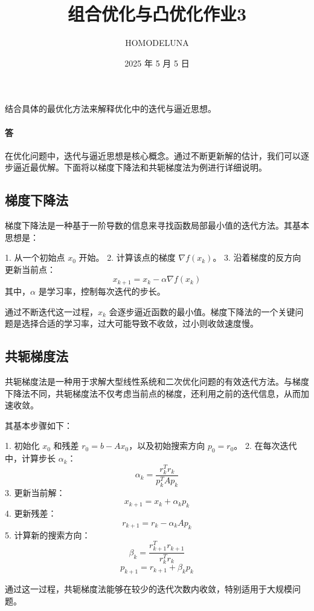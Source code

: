\documentclass[a4paper]{article}
\title{组合优化与凸优化作业3}
\author{HOMODELUNA}
\date{2025 年 5 月 5 日}
\begin{document}
\maketitle
\section{}
结合具体的最优化方法来解释优化中的迭代与逼近思想。

\paragraph{答}
在优化问题中，迭代与逼近思想是核心概念。通过不断更新解的估计，我们可以逐步逼近最优解。下面将以梯度下降法和共轭梯度法为例进行详细说明。

\subsection{梯度下降法}

梯度下降法是一种基于一阶导数的信息来寻找函数局部最小值的迭代方法。其基本思想是：

1. 从一个初始点 \( x_0 \) 开始。
2. 计算该点的梯度 \( \nabla f(x_k) \)。
3. 沿着梯度的反方向更新当前点：
   \[
   x_{k+1} = x_k - \alpha \nabla f(x_k)
   \]
   其中，\( \alpha \) 是学习率，控制每次迭代的步长。

通过不断迭代这一过程，\( x_k \) 会逐步逼近函数的最小值。梯度下降法的一个关键问题是选择合适的学习率，过大可能导致不收敛，过小则收敛速度慢。

\subsection{共轭梯度法}

共轭梯度法是一种用于求解大型线性系统和二次优化问题的有效迭代方法。与梯度下降法不同，共轭梯度法不仅考虑当前点的梯度，还利用之前的迭代信息，从而加速收敛。

其基本步骤如下：

1. 初始化 \( x_0 \) 和残差 \( r_0 = b - Ax_0 \)，以及初始搜索方向 \( p_0 = r_0 \)。
2. 在每次迭代中，计算步长 \( \alpha_k \)：
   \[
   \alpha_k = \frac{r_k^T r_k}{p_k^T Ap_k}
   \]
3. 更新当前解：
   \[
   x_{k+1} = x_k + \alpha_k p_k
   \]
4. 更新残差：
   \[
   r_{k+1} = r_k - \alpha_k Ap_k
   \]
5. 计算新的搜索方向：
   \[
   \beta_k = \frac{r_{k+1}^T r_{k+1}}{r_k^T r_k}
   \]
   \[
   p_{k+1} = r_{k+1} + \beta_k p_k
   \]

通过这一过程，共轭梯度法能够在较少的迭代次数内收敛，特别适用于大规模问题。
\end{document}
